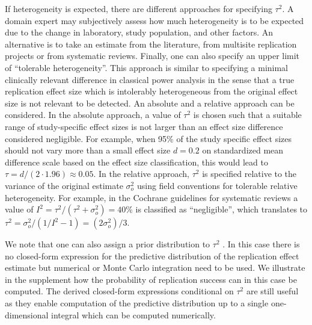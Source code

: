 If heterogeneity is expected, there are different approaches for specifying
$\tau^{2}$. A domain expert may subjectively assess how much heterogeneity is to
be expected due to the change in laboratory, study population, and other
factors. An alternative is to take an estimate from the literature, \eg{} from
multisite replication projects or from systematic reviews. Finally, one can also
specify an upper limit of ``tolerable heterogeneity''. This approach is similar
to specifying a minimal clinically relevant difference in classical power
analysis in the sense that a true replication effect size which is intolerably
heterogeneous from the original effect size is not relevant to be detected. An
absolute \citep[ch. 5.7.3]{Spiegelhalter2004} and a relative approach
\citep{Held2020c} can be considered. In the absolute approach, a value of
$\tau^{2}$ is chosen such that a suitable range of study-specific effect sizes
is not larger than an effect size difference considered negligible. For example,
when 95\% of the study specific effect sizes should not vary more than a small
effect size \eg{} $d = 0.2$ on standardized mean difference
scale based on the \citet{Cohen1992} effect size classification, this would lead
to $\tau = d/(2 \cdot 1.96) \approx 0.05$. %
In the relative approach, $\tau^{2}$ is specified relative to the variance of
the original estimate $\sigma^{2}_{o}$ using field conventions for tolerable
relative heterogeneity. For example, in the Cochrane guidelines for systematic
reviews \citep{Deeks2019} a value of
$I^{2} = \tau^{2}/(\tau^{2} + \sigma^{2}_{o}) = 40\%$ is classified as
``negligible'', which translates to
$\tau^{2} = \sigma^{2}_{o}/(1/I^{2} - 1) = (2\sigma^{2}_{o})/3$.

We note that one can also assign a prior distribution to $\tau^2$ \citep[for an
overview of prior distributions for heterogeneity variances in the normal-normal
hierarchical model see][]{Rover2021}. In this case there is no closed-form
expression for the predictive distribution of the replication effect estimate
but numerical or Monte Carlo integration need to be used. %
We illustrate in the supplement how the probability of replication success can
in this case be computed. The derived closed-form expressions conditional on
$\tau^{2}$ are still useful as they enable computation of the predictive
distribution up to a single one-dimensional integral which can be computed
numerically.

